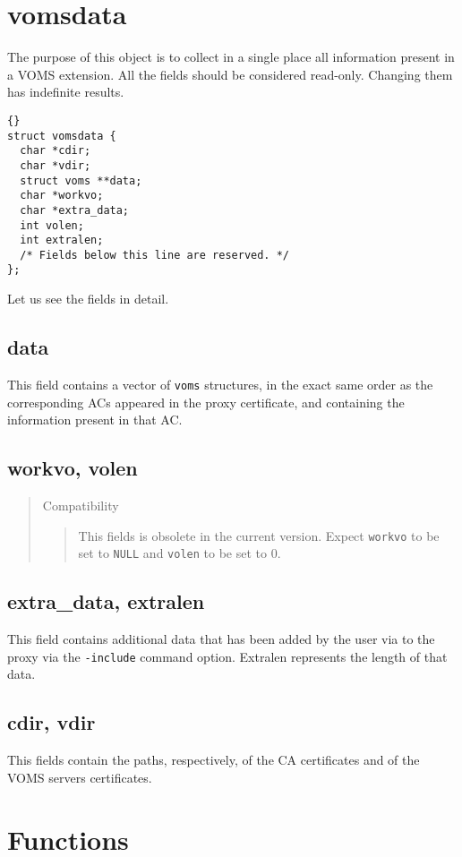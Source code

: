 \documentclass[a4paper]{book}
\newenvironment{compatibility}{\begin{quote}\color{red}Compatibility\begin{quote}}{\end{quote}\color{black}\end{quote}}
\begin{document}
\section{vomsdata}
The purpose of this object is to collect in a single place all
information present in a VOMS extension.  All the fields should be
considered read-only.  Changing them has indefinite results.

{\begin{lstlisting}{}
struct vomsdata {
  char *cdir;
  char *vdir;
  struct voms **data;
  char *workvo;
  char *extra_data;
  int volen;
  int extralen;
  /* Fields below this line are reserved. */
};
\end{lstlisting}}

Let us see the fields in detail.

\subsection{data}
This field contains a vector of \verb|voms| structures, in the exact
same order as the corresponding ACs appeared in the proxy certificate,
and containing the information present in that AC.

\subsection{workvo, volen}
\begin{compatibility}
This fields is obsolete in the current version.  Expect \verb|workvo|
to be set to \verb|NULL| and \verb|volen| to be set to 0.
\end{compatibility}

\subsection{extra\_data, extralen}
This field contains additional data that has been added by the user
via to the proxy via the \verb|-include| command option.  Extralen
represents the length of that data.

\subsection{cdir, vdir}
This fields contain the paths, respectively, of the CA certificates
and of the VOMS servers certificates.


\section{Functions}
\end{document}
